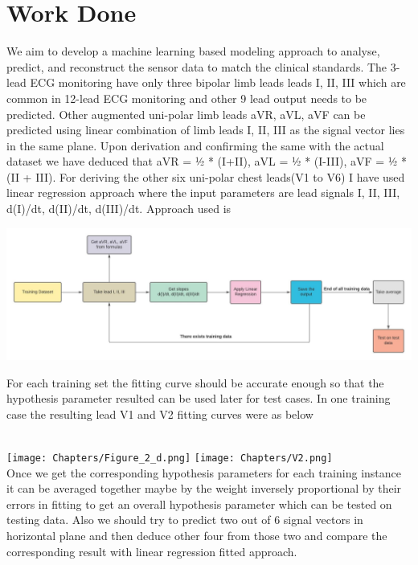 \documentclass[10pt,a4paper]{article}
\begin{document}
\section{Work Done}
\begin{normalsize}
 We aim to develop a machine learning based modeling approach to analyse, predict, and reconstruct the sensor data to match the clinical standards. The 3-lead ECG monitoring have only three bipolar limb leads leads I, II, III which are common in 12-lead ECG monitoring and other 9 lead output needs to be predicted. Other augmented uni-polar limb leads aVR, aVL, aVF can be predicted using linear combination of limb leads I, II, III as the signal vector lies in the same plane. Upon derivation and confirming the same with the actual dataset \citep{liu2018data} we have deduced that aVR = ½ * (I+II), aVL = ½ * (I-III), aVF = ½ * (II + III). For deriving the other six uni-polar chest leads(V1 to V6) I have used linear regression approach where the input parameters are lead signals I, II, III, d(I)/dt, d(II)/dt, d(III)/dt. Approach used is\end{normalsize}
\includegraphics[width=\textwidth,height=\textheight,keepaspectratio]{save.jpeg} \begin{normalsize}
For each training set the fitting curve should be accurate enough so that the hypothesis parameter resulted can be used later for test cases. In one training case the resulting lead V1 and V2 fitting curves were as below\end{normalsize}\\
\texttt{[image: Chapters/Figure\_2\_d.png]}
\texttt{[image: Chapters/V2.png]}\\Once we get the corresponding hypothesis parameters for each training instance it can be averaged together maybe by the weight inversely proportional by their errors in fitting to get an overall hypothesis parameter which can be tested on testing data. Also we should try to predict two out of 6 signal vectors in horizontal plane and then deduce other four from those two and compare the corresponding result with linear regression fitted approach. 
\end{document}
